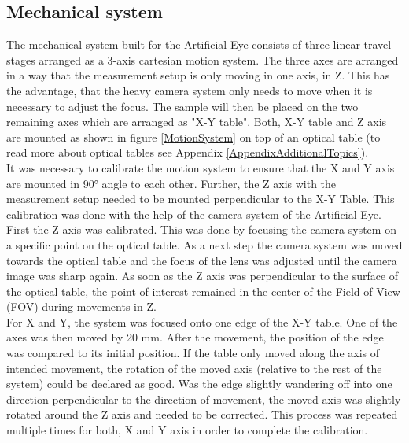 \subsection{Mechanical system}
The mechanical system built for the Artificial Eye consists of three linear travel stages arranged as a 3-axis cartesian motion system. The three axes are arranged in a way that the measurement setup is only moving in one axis, in Z. This has the advantage, that the heavy camera system only needs to move when it is necessary to adjust the focus. The sample will then be placed on the two remaining axes which are arranged as "X-Y table". Both, X-Y table and Z axis are mounted as shown in figure \ref{MotionSystem} on top of an optical table (to read more about optical tables see Appendix \ref{AppendixAdditionalTopics}).\\
It was necessary to calibrate the motion system to ensure that the X and Y axis are mounted in 90° angle to each other. Further, the Z axis with the measurement setup needed to be mounted perpendicular to the X-Y Table. This calibration was done with the help of the camera system of the Artificial Eye.\\
First the Z axis was calibrated. This was done by focusing the camera system on a specific point on the optical table. As a next step the camera system was moved towards the optical table and the focus of the lens was adjusted until the camera image was sharp again. As soon as the Z axis was perpendicular to the surface of the optical table, the point of interest remained in the center of the Field of View (FOV) during movements in Z.\\
For X and Y, the system was focused onto one edge of the X-Y table. One of the axes was then moved by 20 mm. After the movement, the position of the edge was compared to its initial position. If the table only moved along the axis of intended movement, the rotation of the moved axis (relative to the rest of the system) could be declared as good. Was the edge slightly wandering off into one direction perpendicular to the direction of movement, the moved axis was slightly rotated around the Z axis and needed to be corrected. This process was repeated multiple times for both, X and Y axis in order to complete the calibration.

